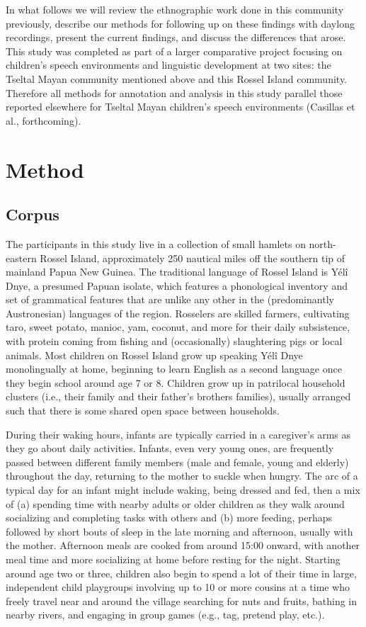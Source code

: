 \documentclass[,man,floatsintext]{apa6}
\begin{document}
In what follows we will review the ethnographic work done in this
community previously, describe our methods for following up on these
findings with daylong recordings, present the current findings, and
discuss the differences that arose. This study was completed as part of
a larger comparative project focusing on children's speech environments
and linguistic development at two sites: the Tseltal Mayan community
mentioned above and this Rossel Island community. Therefore all methods
for annotation and analysis in this study parallel those reported
elsewhere for Tseltal Mayan children's speech environments (Casillas et
al., forthcoming).

\section{Method}\label{methods}

\subsection{Corpus}\label{methods-dataset}

The participants in this study live in a collection of small hamlets on
north-eastern Rossel Island, approximately 250 nautical miles off the
southern tip of mainland Papua New Guinea. The traditional language of
Rossel Island is Yélî Dnye, a presumed Papuan isolate, which features a
phonological inventory and set of grammatical features that are unlike
any other in the (predominantly Austronesian) languages of the region.
Rosselers are skilled farmers, cultivating taro, sweet potato, manioc,
yam, coconut, and more for their daily subsistence, with protein coming
from fishing and (occasionally) slaughtering pigs or local animals. Most
children on Rossel Island grow up speaking Yélî Dnye monolingually at
home, beginning to learn English as a second language once they begin
school around age 7 or 8. Children grow up in patrilocal household
clusters (i.e., their family and their father's brothers families),
usually arranged such that there is some shared open space between
households.

During their waking hours, infants are typically carried in a
caregiver's arms as they go about daily activities. Infants, even very
young ones, are frequently passed between different family members (male
and female, young and elderly) throughout the day, returning to the
mother to suckle when hungry. The arc of a typical day for an infant
might include waking, being dressed and fed, then a mix of (a) spending
time with nearby adults or older children as they walk around
socializing and completing tasks with others and (b) more feeding,
perhaps followed by short bouts of sleep in the late morning and
afternoon, usually with the mother. Afternoon meals are cooked from
around 15:00 onward, with another meal time and more socializing at home
before resting for the night. Starting around age two or three, children
also begin to spend a lot of their time in large, independent child
playgroups involving up to 10 or more cousins at a time who freely
travel near and around the village searching for nuts and fruits,
bathing in nearby rivers, and engaging in group games (e.g., tag,
pretend play, etc.).
\end{document}

